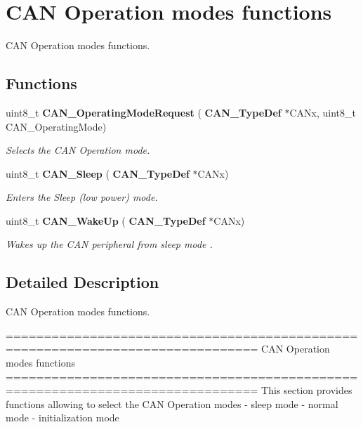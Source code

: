 \section{C\+AN Operation modes functions}
\label{group__CAN__Group4}


C\+AN Operation modes functions.  


\subsection*{Functions}
\begin{DoxyCompactItemize}
\item 
uint8\+\_\+t \textbf{ C\+A\+N\+\_\+\+Operating\+Mode\+Request} (\textbf{ C\+A\+N\+\_\+\+Type\+Def} $\ast$C\+A\+Nx, uint8\+\_\+t C\+A\+N\+\_\+\+Operating\+Mode)
\begin{DoxyCompactList}\small\item\em Selects the C\+AN Operation mode. \end{DoxyCompactList}\item 
uint8\+\_\+t \textbf{ C\+A\+N\+\_\+\+Sleep} (\textbf{ C\+A\+N\+\_\+\+Type\+Def} $\ast$C\+A\+Nx)
\begin{DoxyCompactList}\small\item\em Enters the Sleep (low power) mode. \end{DoxyCompactList}\item 
uint8\+\_\+t \textbf{ C\+A\+N\+\_\+\+Wake\+Up} (\textbf{ C\+A\+N\+\_\+\+Type\+Def} $\ast$C\+A\+Nx)
\begin{DoxyCompactList}\small\item\em Wakes up the C\+AN peripheral from sleep mode . \end{DoxyCompactList}\end{DoxyCompactItemize}


\subsection{Detailed Description}
C\+AN Operation modes functions. 

\begin{DoxyVerb} ===============================================================================
                      CAN Operation modes functions
 ===============================================================================  
  This section provides functions allowing to select the CAN Operation modes
  - sleep mode
  - normal mode 
  - initialization mode\end{DoxyVerb}
 

